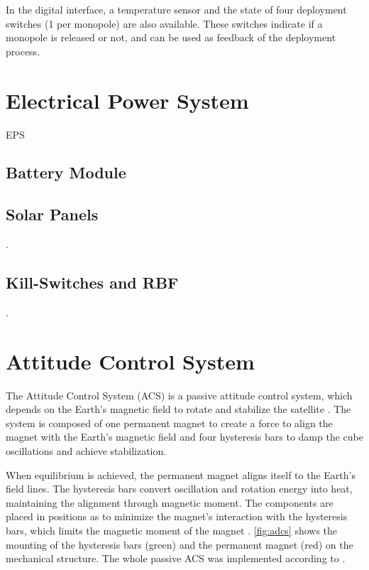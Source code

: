 In the digital interface, a temperature sensor and the state of four deployment switches (1 per monopole) are also available. These switches indicate if a monopole is released or not, and can be used as feedback of the deployment process.

\section{Electrical Power System}

EPS \cite{eps2}

\subsection{Battery Module}

\cite{bat4c}

\subsection{Solar Panels}

.

\subsection{Kill-Switches and RBF}

.

\section{Attitude Control System}

The Attitude Control System (ACS) is a passive attitude control system, which depends on the Earth's magnetic field to rotate and stabilize the satellite \cite{santoni2009,gerhardt2010}. The system is composed of one permanent magnet to create a force to align the magnet with the Earth's magnetic field and four hysteresis bars to damp the cube oscillations and achieve stabilization.

When equilibrium is achieved, the permanent magnet aligns itself to the Earth's field lines. The hysteresis bars convert oscillation and rotation energy into heat, maintaining the alignment through magnetic moment. The components are placed in positions as to minimize the magnet's interaction with the hysteresis bars, which limits the magnetic moment of the magnet \cite{francois2010}. \autoref{fig:adcs} shows the mounting of the hysteresis bars (green) and the permanent magnet (red) on the mechanical structure. The whole passive ACS was implemented according to \cite{francois2010}.

